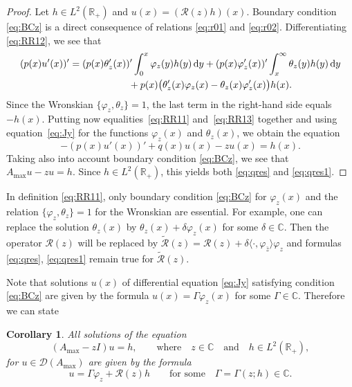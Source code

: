 \documentclass[pdftex]{sigma}%
\numberwithin{equation}{section}
\newtheorem{Corollary}[Theorem]{Corollary}
\begin{document}
 \begin{proof}
 Let $h\in L^2 ({\mathbb R}_{+})$ and $u(x)= ({\mathcal R} (z)h)(x)$. Boundary condition \eqref{eq:BCz} is a direct consequence of relations \eqref{eq:r01} and \eqref{eq:r02}. Differentiating \eqref{eq:RR12}, we see that
 \begin{gather}
 (p(x)u' (x))' = (p(x) \theta_{z}' (x) )'\int_{0}^x \varphi_{z} (y) h(y) \,{\rm d}y+ (p(x) \varphi_{z}' (x) )' \int_x^\infty \theta_{z} (y) h(y) \,{\rm d}y \nonumber \\
 \hphantom{(p(x)u' (x))' =}{} + p(x) \big( \theta'_{z}(x) \varphi_{z}(x)-\theta
 _{z}(x) \varphi'_{z}(x)\big) h(x).
 \label{eq:RR13}\end{gather}
Since the Wronskian $\{ \varphi_{z}, \theta_{z}\}=1 $, the last term in the right-hand side equals $-h(x)$. Putting now equalities~\eqref{eq:RR11} and~\eqref{eq:RR13} together and using equation~\eqref{eq:Jy} for the functions $\varphi_{z}(x)$ and $\theta_{z}(x)$, we obtain the equation
\[
- (p(x) u' (x))' + q(x) u(x)-z u(x)=h(x) .
 \]
 Taking also into account boundary condition \eqref{eq:BCz}, we see that $ A_{\max} u -z u=h $. Since $h\in L^2 ({\mathbb R}_{+})$, this yields both \eqref{eq:qres} and \eqref{eq:qres1}.
 \end{proof}

 \begin{Remark}\label{res3}
 In definition \eqref{eq:RR11}, only boundary condition \eqref{eq:BCz} for $\varphi_{z} (x)$ and the relation $\{ \varphi_{z}, \theta_{z}\}=1 $ for the Wronskian are essential. For example, one can replace the solution $\theta_{z}(x)$ by $\theta_{z}(x)+ \delta \varphi_{z} (x)$ for some $\delta \in {\mathbb C}$. Then the operator
 $ {\mathcal R} (z)$ will be replaced by
 $\widetilde{\mathcal R} (z)= {\mathcal R} (z) +\delta \langle \cdot, \varphi_{\bar{z} }\rangle \varphi_{z}$ and formulas \eqref{eq:qres}, \eqref{eq:qres1} remain true for $\widetilde{\mathcal R} (z)$.
 \end{Remark}

 Note that solutions $u(x)$ of differential equation \eqref{eq:Jy} satisfying condition \eqref{eq:BCz} are given by the formula $u(x)= \Gamma \varphi_{z} (x)$ for some $ \Gamma \in{\mathbb C}$. Therefore we
 can state

 \begin{Corollary}\label{res1}
 All solutions of the equation
 \[
(A_{\max} -zI) u =h, \qquad \mbox{where} \quad z\in {\mathbb C} \quad \mbox{and}\quad h\in L^2 ({\mathbb R}_{+}),
\]
 for $u\in {\mathcal D} (A_{\max} )$ are given by the formula
 \begin{equation}
 u = \Gamma \varphi_{z}+ {\mathcal R} (z) h \qquad \mbox{for some} \quad \Gamma=\Gamma (z;h) \in{\mathbb C}.
\label{eq:qres3}\end{equation}
 \end{Corollary}
\end{document}
